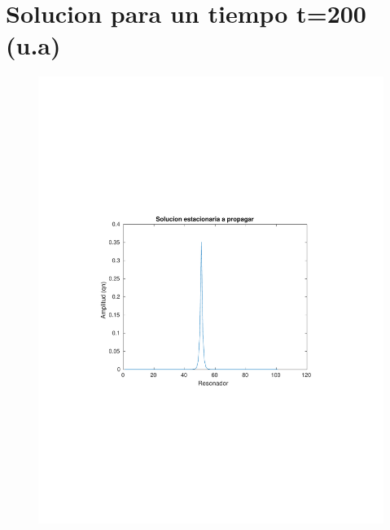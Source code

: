 \documentclass[10pt,a4paper]{article}
\author{M.Sabogal}
\begin{document}
\section{Solucion para un tiempo t=200 (u.a)}

\begin{figure}[h!]
\centering 
\includegraphics[scale=0.8]{SE1.pdf}
\end{figure}
\end{document}
